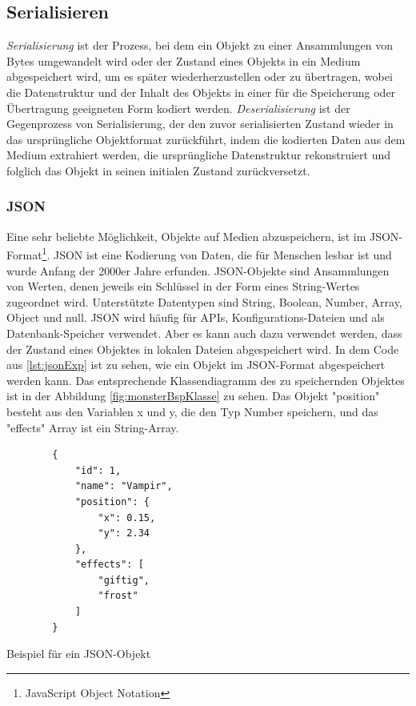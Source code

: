 \subsection{Serialisieren}

\textit{Serialisierung} ist der Prozess, bei dem ein Objekt zu einer Ansammlungen von Bytes umgewandelt wird oder der Zustand eines Objekts in ein Medium abgespeichert wird, um es später wiederherzustellen oder zu übertragen, wobei die Datenstruktur und der Inhalt des Objekts in einer für die Speicherung oder Übertragung geeigneten Form kodiert werden. \textit{Deserialisierung} ist der Gegenprozess von Serialisierung, der den zuvor serialisierten Zustand wieder in das ursprüngliche Objektformat zurückführt, indem die kodierten Daten aus dem Medium extrahiert werden, die ursprüngliche Datenstruktur rekonstruiert und folglich das Objekt in seinen initialen Zustand zurückversetzt.\cite{codeguruWorkingWith}

\subsubsection{JSON}
Eine sehr beliebte Möglichkeit, Objekte auf Medien abzuspeichern, ist im JSON-Format\footnote{JavaScript Object Notation }. JSON ist eine Kodierung von Daten, die für Menschen lesbar ist und wurde Anfang der 2000er Jahre erfunden. JSON-Objekte sind Ansammlungen von Werten, denen jeweils ein Schlüssel in der Form eines String-Wertes zugeordnet wird. Unterstützte Datentypen sind String, Boolean, Number, Array, Object und null. JSON wird häufig für APIs, Konfigurations-Dateien und als Datenbank-Speicher verwendet. Aber es kann auch dazu verwendet werden, dass der Zustand eines Objektes in lokalen Dateien abgespeichert wird.\cite{mongodbJSONBSON} 
In dem Code aus \ref{lst:jsonExp} ist zu sehen, wie ein Objekt im JSON-Format abgespeichert werden kann. Das entsprechende Klassendiagramm des zu speichernden Objektes ist in der Abbildung \ref{fig:monsterBspKlasse} zu sehen. Das Objekt "position" besteht aus den Variablen x und y, die den Typ Number speichern, und das "effects" Array ist ein String-Array. 

\begin{listing}[htp]
    \begin{verbatim}
        {
            "id": 1,
            "name": "Vampir",
            "position": {
                "x": 0.15,
                "y": 2.34
            },
            "effects": [
                "giftig", 
                "frost"
            ]
        }
    \end{verbatim}
    \caption{Beispiel für ein JSON-Objekt}
    \label{lst:jsonExp}
\end{listing}

